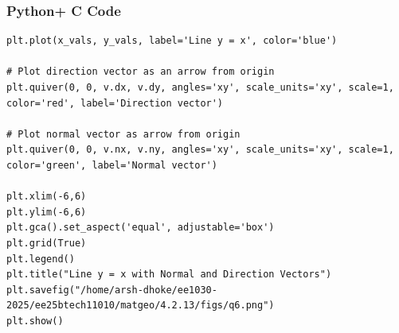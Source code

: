 \documentclass{beamer}
\begin{document}
\begin{frame}[fragile]
    \frametitle{Python+ C Code}
\begin{lstlisting}
plt.plot(x_vals, y_vals, label='Line y = x', color='blue')

# Plot direction vector as an arrow from origin
plt.quiver(0, 0, v.dx, v.dy, angles='xy', scale_units='xy', scale=1, color='red', label='Direction vector')

# Plot normal vector as arrow from origin
plt.quiver(0, 0, v.nx, v.ny, angles='xy', scale_units='xy', scale=1, color='green', label='Normal vector')

plt.xlim(-6,6)
plt.ylim(-6,6)
plt.gca().set_aspect('equal', adjustable='box')
plt.grid(True)
plt.legend()
plt.title("Line y = x with Normal and Direction Vectors")
plt.savefig("/home/arsh-dhoke/ee1030-2025/ee25btech11010/matgeo/4.2.13/figs/q6.png")
plt.show()

\end{lstlisting}
\end{frame}
\end{document}
